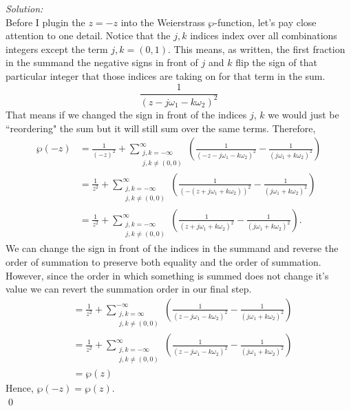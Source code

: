 \documentclass[10pt]{amsart}
\theoremstyle{nonumberplain}
\begin{document}
\begin{enumerate}[label={\bf {\arabic*}:}]
\begin{enumerate}
\noindent
\textit{Solution:} \\
Before I plugin the $z = -z$ into the Weierstrass $\wp$-function, let's pay close attention to one detail.
Notice that the $j,k$ indices index over all combinations integers except the term $j,k = (0,1)$.
This means, as written, the first fraction in the summand the negative signs in front of $j$ and $k$ flip the sign of that particular integer that those indices are taking on for that term in the sum.
$$ \frac{1}{\left(z-j \omega_1-k \omega_2\right)^2} $$
That means if we changed the sign in front of the indices $j$, $k$ we would just be ``reordering" the sum but it will still sum over the same terms.
Therefore, 
\begin{align*}
\wp(-z)
	&= \frac{1}{(-z)^2} + \sum_{\substack{j, k=-\infty \\ j,k \neq (0,0)}}^{\infty} \left(\frac{1}{\left(-z-j \omega_1-k \omega_2\right)^2}-\frac{1}{\left(j \omega_1+k \omega_2\right)^2}\right) \\
	&= \frac{1}{z^2} + \sum_{\substack{j, k=-\infty \\ j,k \neq (0,0)}}^{\infty} \left(\frac{1}{\left(-(z + j \omega_1 + k \omega_2)\right)^2}-\frac{1}{\left(j \omega_1+k \omega_2\right)^2}\right) \\
	&= \frac{1}{z^2} + \sum_{\substack{j, k=-\infty \\ j,k \neq (0,0)}}^{\infty} \left(\frac{1}{\left(z + j \omega_1 + k \omega_2\right)^2}-\frac{1}{\left(j \omega_1+k \omega_2\right)^2}\right).
\end{align*}
We can change the sign in front of the indices in the summand and reverse the order of summation to preserve both equality and the order of summation.
However, since the order in which something is summed does not change it's value we can revert the summation order in our final step.
\begin{align*}
	&= \frac{1}{z^2} + \sum_{\substack{j, k=\infty \\ j,k \neq (0,0)}}^{-\infty} \left(\frac{1}{\left(z - j \omega_1 - k \omega_2\right)^2}-\frac{1}{\left(j \omega_1+k \omega_2\right)^2}\right) \\
	&= \frac{1}{z^2} + \sum_{\substack{j, k=-\infty \\ j,k \neq (0,0)}}^{\infty} \left(\frac{1}{\left(z - j \omega_1 - k \omega_2\right)^2}-\frac{1}{\left(j \omega_1+k \omega_2\right)^2}\right) \\
	&= \wp(z)
\end{align*}
Hence, $\wp(-z) = \wp(z)$. \\
\qed \\


\end{enumerate}
\end{enumerate}
\end{document}

